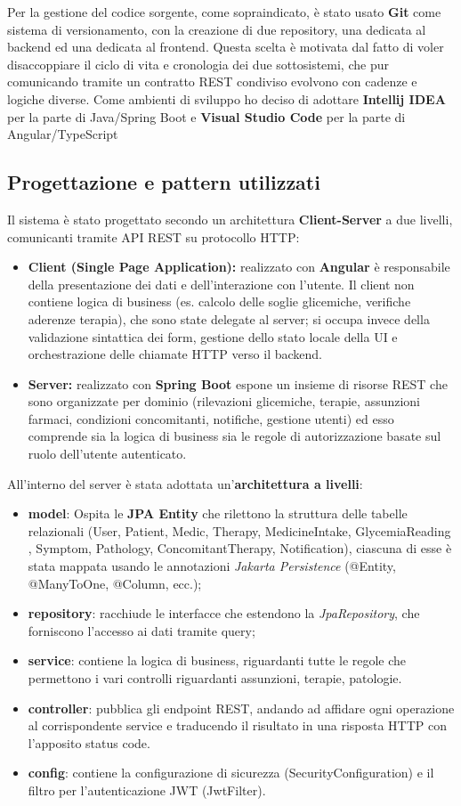 \documentclass{article}
\begin{document}
Per la gestione del codice sorgente, come sopraindicato, è stato usato \textbf{Git} come sistema di versionamento, con la creazione di due repository, una dedicata al backend ed una dedicata al frontend.
Questa scelta è motivata dal fatto di voler disaccoppiare il ciclo di vita e cronologia dei due sottosistemi, che pur comunicando tramite un contratto REST condiviso evolvono con cadenze e logiche diverse.
Come ambienti di sviluppo ho deciso di adottare \textbf{Intellij IDEA} per la parte di Java/Spring Boot e \textbf{Visual Studio Code} per la parte di Angular/TypeScript
\subsection{Progettazione e pattern utilizzati}
Il sistema è stato progettato secondo un architettura \textbf{Client-Server} a due livelli, comunicanti tramite API REST su protocollo HTTP:
\begin{itemize}
   \item \textbf{Client (Single Page Application):} realizzato con \textbf{Angular} è responsabile della presentazione dei dati e dell'interazione con l'utente. Il client non contiene logica di business (es. calcolo delle soglie glicemiche, verifiche aderenze terapia), che sono state delegate al server; si occupa invece della validazione sintattica dei form, gestione dello stato locale della UI e orchestrazione delle chiamate HTTP verso il backend.
   \item \textbf{Server:} realizzato con \textbf{Spring Boot} espone un insieme di risorse REST che sono organizzate per dominio (rilevazioni glicemiche, terapie, assunzioni farmaci, condizioni concomitanti, notifiche, gestione utenti) ed esso comprende sia la logica di business sia le regole di autorizzazione basate sul ruolo dell'utente autenticato.
\end{itemize}
All'interno del server è stata adottata un'\textbf{architettura a livelli}:
\begin{itemize}
   \item \textbf{model}: Ospita le \textbf{JPA Entity} che rilettono la struttura delle tabelle relazionali (User, Patient, Medic, Therapy, MedicineIntake, GlycemiaReading
       , Symptom, Pathology, ConcomitantTherapy, Notification), ciascuna di esse è stata mappata usando le annotazioni \textit{Jakarta Persistence} (@Entity, @ManyToOne, @Column, ecc.);
   \item \textbf{repository}: racchiude le interfacce che estendono la \textit{JpaRepository}, che forniscono l'accesso ai dati tramite query;
   \item \textbf{service}: contiene la logica di business, riguardanti tutte le regole che permettono i vari controlli riguardanti assunzioni, terapie, patologie.
   \item \textbf{controller}: pubblica gli endpoint REST, andando ad affidare ogni operazione al corrispondente service e traducendo il risultato in una risposta HTTP con l'apposito status code.
   \item \textbf{config}: contiene la configurazione di sicurezza (SecurityConfiguration) e il filtro per l'autenticazione JWT (JwtFilter).
\end{itemize}
\end{document}
